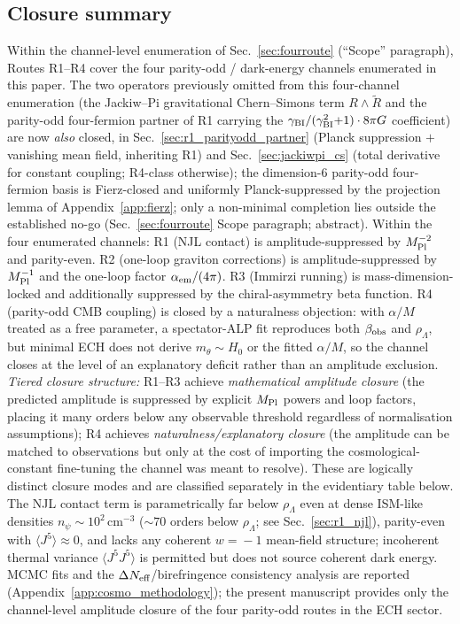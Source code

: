 \documentclass[aps,prd,twocolumn,superscriptaddress,showpacs,preprintnumbers,nofootinbib,longbibliography,floatfix]{revtex4-2}
\newcommand{\Neff}{N_{\rm eff}}
\begin{document}
\subsection{Closure summary}
\label{sec:fourroute_summary}
Within the channel-level enumeration of Sec.~\ref{sec:fourroute}
(``Scope'' paragraph), Routes R1--R4 cover the four parity-odd /
dark-energy channels enumerated in this paper. The two operators previously omitted from
this four-channel enumeration (the Jackiw--Pi gravitational
Chern--Simons term $R\!\wedge\!\widetilde R$ and the parity-odd
four-fermion partner of R1 carrying the
$\gamma_{\rm BI}/(\gamma_{\rm BI}^2{+}1)\cdot 8\pi G$ coefficient) are
now \emph{also} closed, in Sec.~\ref{sec:r1_parityodd_partner}
(Planck suppression $+$ vanishing mean field, inheriting R1) and
Sec.~\ref{sec:jackiwpi_cs} (total derivative for constant coupling;
R4-class otherwise); the dimension-6 parity-odd four-fermion basis is
Fierz-closed and uniformly Planck-suppressed by the projection lemma of
Appendix~\ref{app:fierz}; only a non-minimal completion lies outside the
established no-go (Sec.~\ref{sec:fourroute} Scope paragraph;
abstract). Within the four enumerated channels:
R1 (NJL contact) is amplitude-suppressed by $M_{\rm Pl}^{-2}$ and
parity-even. R2 (one-loop graviton corrections) is amplitude-suppressed
by $M_{\rm Pl}^{-1}$ and the one-loop factor $\alpha_{\rm em}/(4\pi)$.
R3 (Immirzi running) is mass-dimension-locked and additionally
suppressed by the chiral-asymmetry beta function. R4 (parity-odd
CMB coupling) is closed by a naturalness objection: with $\alpha/M$
treated as a free parameter, a spectator-ALP fit reproduces both
$\beta_{\rm obs}$ and $\rho_\Lambda$, but minimal ECH does not derive
$m_\theta\sim H_0$ or the fitted $\alpha/M$, so the channel closes at
the level of an explanatory deficit rather than an amplitude exclusion.
\emph{Tiered closure structure:} R1--R3 achieve \emph{mathematical
amplitude closure} (the predicted amplitude is suppressed by explicit
$M_{\rm Pl}$ powers and loop factors, placing it many orders below any
observable threshold regardless of normalisation assumptions);
R4 achieves \emph{naturalness/explanatory closure} (the amplitude can
be matched to observations but only at the cost of importing the
cosmological-constant fine-tuning the channel was meant to resolve).
These are logically distinct closure modes and are classified
separately in the evidentiary table below.
The NJL contact term is parametrically far below $\rho_\Lambda$ even at
dense ISM-like densities $n_\psi\!\sim\!10^2\,\text{cm}^{-3}$ (${\sim}70$ orders
below $\rho_\Lambda$; see Sec.~\ref{sec:r1_njl}),
parity-even with $\langle J^5\rangle\!\approx\!0$, and lacks any
coherent $w\!=\!-1$ mean-field structure; incoherent thermal variance
$\langle J^5 J^5\rangle$ is permitted but does not source coherent dark
energy. MCMC fits and the
$\Delta\Neff$/birefringence consistency analysis are reported
(Appendix~\ref{app:cosmo_methodology}); the present
manuscript provides only the channel-level amplitude closure of the
four parity-odd routes in the ECH sector.
\end{document}
